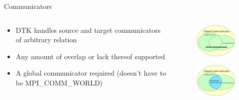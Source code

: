 \documentclass{beamer}
\begin{document}
\begin{frame}{Communicators}

  \begin{columns}
    
    \begin{column}{0.5\textwidth}
      \begin{itemize}
      \item DTK handles source and target communicators of arbitrary
        relation 
        \medskip
      \item Any amount of overlap or lack thereof supported
        \medskip
      \item A global communicator required (doesn't have to be
        MPI\_COMM\_WORLD) 
      \end{itemize}
    \end{column}

    \begin{column}{0.5\textwidth}
      \begin{figure}[htpb!]
        \centering \includegraphics[width=1.7in]{union_comm.pdf}
      \end{figure}

      \begin{figure}[htpb!]
        \centering \includegraphics[width=1.7in]{intersection_comm.pdf}
      \end{figure}
    \end{column}

  \end{columns}

\end{frame}
\end{document}
